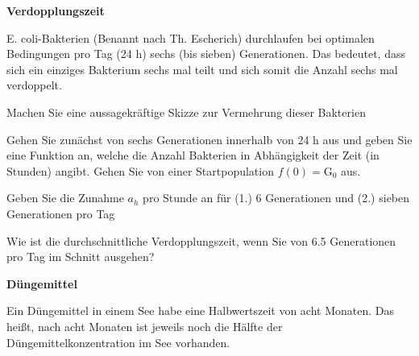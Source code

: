 \bbwActAufgabenNr{} \textbf{Verdopplungszeit}

E. coli-Bakterien (Benannt nach Th. Escherich) durchlaufen bei
optimalen Bedingungen pro Tag (24 h) sechs (bis sieben) Generationen. Das
bedeutet, dass sich ein einziges Bakterium sechs mal teilt und sich
somit die Anzahl sechs mal verdoppelt.

\begin{bbwAufgabenBlock}

\item Machen Sie eine aussagekräftige Skizze zur Vermehrung dieser Bakterien
  
\item Gehen Sie zunächst von sechs Generationen innerhalb von 24 h aus
  und geben Sie eine Funktion an, welche die Anzahl Bakterien in
  Abhängigkeit der Zeit (in Stunden) angibt. Gehen Sie von einer
  Startpopulation $f(0) = \text{G}_0$ aus.

  
  
\item Geben Sie die Zunahme $a_h$ pro Stunde an für (1.) 6 Generationen
  und (2.) sieben Generationen pro Tag

 

  
\item Wie ist die durchschnittliche Verdopplungszeit, wenn Sie von 6.5 Generationen pro
  Tag im Schnitt ausgehen?
  

\end{bbwAufgabenBlock}
\newpage


\bbwActAufgabenNr{} \textbf{Düngemittel}

Ein Düngemittel in einem See habe eine Halbwertszeit von acht
Monaten. Das heißt, nach acht Monaten ist jeweils noch die Hälfte der
Düngemittelkonzentration im See vorhanden.

